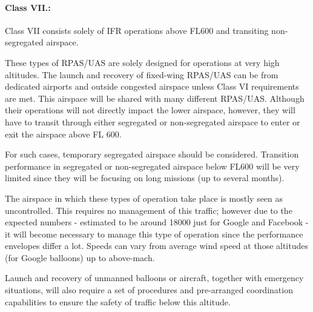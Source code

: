 \paragraph{Class VII.:} Class VII consists solely of IFR operations above FL600 and transiting non-segregated airspace.
    
    These types of RPAS/UAS are solely designed for operations at very high altitudes. The launch and recovery of fixed-wing RPAS/UAS can be from dedicated airports and outside congested airspace unless Class VI requirements are met. This airspace will be shared with many different RPAS/UAS. Although their operations will not directly impact the lower airspace, however, they will have to transit through either segregated or non-segregated airspace to enter or exit the airspace above FL 600.
    
    For such cases, temporary segregated airspace should be considered. Transition performance in segregated or non-segregated airspace below FL600 will be very limited since they will be focusing on long missions (up to several months).

    The airspace in which these types of operation take place is mostly seen as uncontrolled. This requires no management of this traffic; however due to the expected numbers - estimated to be around 18000 just for Google and Facebook - it will become necessary to manage this type of operation since the performance envelopes differ a lot. Speeds can vary from average wind speed at those altitudes (for Google balloons) up to above-mach.

    Launch and recovery of unmanned balloons or aircraft, together with emergency situations, will also require a set of procedures and pre-arranged coordination capabilities to ensure the safety of traffic below this altitude.


